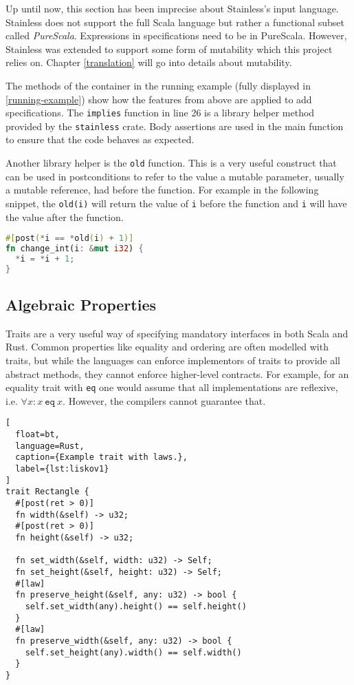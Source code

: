 Up until now, this section has been imprecise about Stainless's input language.
Stainless does not support the full Scala language but rather a functional
subset called \emph{PureScala}. Expressions in specifications need to be in
PureScala. However, Stainless was extended to support some form of mutability
\cite{regb} which this project relies on. Chapter \ref{translation} will go into
details about mutability.

The methods of the container in the running example (fully displayed in
\autoref{running-example}) show how the features from above are applied to add
specifications. The \lstinline!implies! function in line 26 is a library helper
method provided by the \lstinline!stainless! crate. Body assertions are used in
the main function to ensure that the code behaves as expected.

Another library helper is the \lstinline!old! function. This is a very useful
construct that can be used in postconditions to refer to the value a mutable
parameter, usually a mutable reference, had before the function. For example in
the following snippet, the \lstinline!old(i)! will return the value of
\lstinline!i! before the function and  \lstinline!i! will have the value after
the function.

\begin{lstlisting}[language=Rust, caption={The \lstinline!old! helper for postconditions with mutable parameters.}]
#[post(*i == *old(i) + 1)]
fn change_int(i: &mut i32) {
  *i = *i + 1;
}
\end{lstlisting}

\subsection{Algebraic Properties}
\label{laws-intro}

Traits are a very useful way of specifying mandatory interfaces in both Scala
and Rust. Common properties like equality and ordering are often modelled with
traits, but while the languages can enforce implementors of traits to provide
all abstract methods, they cannot enforce higher-level contracts. For example,
for an equality trait with \texttt{eq} one would assume that all implementations
are reflexive, i.e. $\forall x: x~\mathtt{eq}~x$. However, the compilers cannot
guarantee that.

\begin{lstlisting}[
  float=bt,
  language=Rust,
  caption={Example trait with laws.},
  label={lst:liskov1}
]
trait Rectangle {
  #[post(ret > 0)]
  fn width(&self) -> u32;
  #[post(ret > 0)]
  fn height(&self) -> u32;

  fn set_width(&self, width: u32) -> Self;
  fn set_height(&self, height: u32) -> Self;
  #[law]
  fn preserve_height(&self, any: u32) -> bool {
    self.set_width(any).height() == self.height()
  }
  #[law]
  fn preserve_width(&self, any: u32) -> bool {
    self.set_height(any).width() == self.width()
  }
}
\end{lstlisting}


